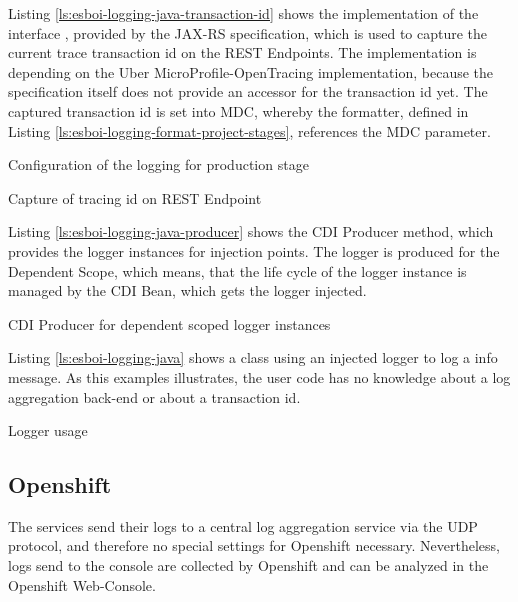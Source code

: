 Listing \vref{ls:esboi-logging-java-transaction-id} shows the implementation of the interface , provided by the JAX-RS specification, which is used to capture the current trace transaction id on the REST Endpoints. The implementation is depending on the Uber MicroProfile-OpenTracing implementation, because the specification itself does not provide an accessor for the transaction id yet. The captured transaction id is set into MDC, whereby the formatter, defined in Listing \vref{ls:esboi-logging-format-project-stages}, references the MDC parameter.
\newpage

\begin{listing}[h]
	\caption{Configuration of the logging for production stage}
	\label{ls:esboi-logging-prod-project-stages}
\end{listing}

\begin{listing}[h]
	\caption{Capture of tracing id on REST Endpoint}
	\label{ls:esboi-logging-java-transaction-id}
\end{listing} 

Listing \vref{ls:esboi-logging-java-producer} shows the CDI Producer method, which provides the logger instances for injection points. The logger is produced for the Dependent Scope, which means, that the life cycle of the logger instance is managed by the CDI Bean, which gets the logger injected.
\newpage

\begin{listing}[h]
	\caption{CDI Producer for dependent scoped logger instances}
	\label{ls:esboi-logging-java-producer}
\end{listing} 

Listing \vref{ls:esboi-logging-java} shows a class using an injected logger to log a info message. As this examples illustrates, the user code has no knowledge about a log aggregation back-end or about a transaction id.

\begin{listing}[h]
	\caption{Logger usage}
	\label{ls:esboi-logging-java}
\end{listing} 

\subsection{Openshift}
\label{sec:esbi-logging-openshift}
The services send their logs to a central log aggregation service via the UDP protocol, and therefore no special settings for Openshift necessary. Nevertheless, logs send to the console are collected by Openshift and can be analyzed in the Openshift Web-Console.

